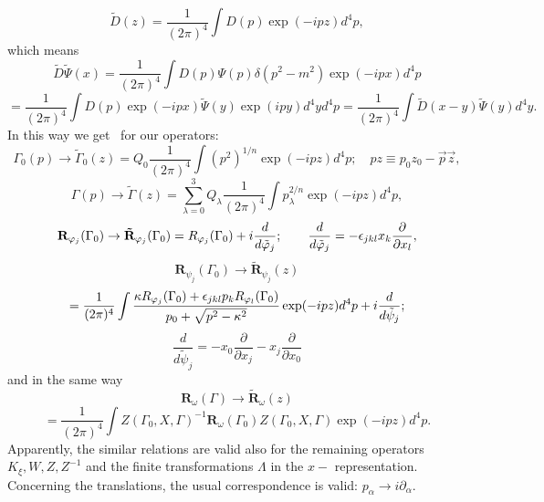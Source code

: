\documentclass[a4paper,a4paper]{article}
\begin{document}
\begin{equation}
\tilde{D}(z)=\frac{1}{(2\pi )^{4}}\int D(p)\exp \left( -ipz\right) d^{4}p,
\label{s111}
\end{equation}%
which means%
\begin{equation}
\tilde{D}\tilde{\Psi}(x)=\frac{1}{(2\pi )^{4}}\int D(p)\Psi (p)\delta
(p^{2}-m^{2})\exp (-ipx)d^{4}p  \label{s112}
\end{equation}%
\begin{equation*}
=\frac{1}{(2\pi )^{4}}\int D(p)\exp (-ipx)\tilde{\Psi}(y)\exp
(ipy)d^{4}yd^{4}p=\frac{1}{(2\pi )^{4}}\int \tilde{D}(x-y)\tilde{\Psi}%
(y)d^{4}y.
\end{equation*}%
In this way we get \ for our operators: 
\begin{equation}
\Gamma _{0}(p)\rightarrow \tilde{\Gamma}_{0}(z)=Q_{0}\frac{1}{(2\pi )^{4}}%
\int (p^{2})^{1/n}\exp (-ipz)d^{4}p;\quad pz\equiv p_{0}z_{0}-\vec{p}\vec{z},
\label{s83}
\end{equation}%
\begin{equation}
\Gamma (p)\rightarrow \tilde{\Gamma}(z)=\sum_{\lambda =0}^{3}Q_{\lambda }%
\frac{1}{(2\pi )^{4}}\int p_{\lambda }^{2/n}\exp (-ipz)d^{4}p,  \label{s84}
\end{equation}%
\begin{equation}
\mathbf{R}_{\varphi _{j}}(\Gamma _{0})\rightarrow \mathbf{\tilde{R}}%
_{\varphi _{j}}(\Gamma _{0})=R_{\varphi _{j}}(\Gamma _{0})+i\frac{d}{d\tilde{%
\varphi}_{j}};\qquad \frac{d}{d\tilde{\varphi}_{j}}=-\epsilon _{jkl}x_{k}%
\frac{\partial }{\partial x_{l}},  \label{s85}
\end{equation}%
\begin{equation}
\mathbf{R}_{\psi _{j}}(\Gamma _{0})\rightarrow \mathbf{\tilde{R}}_{\psi
_{j}}(z)  \label{s86}
\end{equation}%
\begin{equation*}
=\frac{1}{(2\pi )^{4}}\int \frac{\kappa R_{\varphi _{j}}(\Gamma
_{0})+\epsilon _{jkl}p_{k}R_{\varphi _{l}}(\Gamma _{0})}{p_{0}+\sqrt{%
p^{2}-\kappa ^{2}}}\exp (-ipz)d^{4}p+i\frac{d}{d\tilde{\psi}_{j}};
\end{equation*}%
\begin{equation*}
\frac{d}{d\tilde{\psi}_{j}}=-x_{0}\frac{\partial }{\partial x_{j}}-x_{j}%
\frac{\partial }{\partial x_{0}}
\end{equation*}%
and in the same way 
\begin{equation}
\mathbf{R}_{\omega }(\Gamma )\rightarrow \mathbf{\tilde{R}}_{\omega }(z)
\label{s87}
\end{equation}%
\begin{equation*}
=\frac{1}{(2\pi )^{4}}\int Z(\Gamma _{0},X,\Gamma )^{-1}\mathbf{R}_{\omega
}(\Gamma _{0})Z(\Gamma _{0},X,\Gamma )\exp (-ipz)d^{4}p.
\end{equation*}%
Apparently, the similar relations are valid also for the remaining operators 
$K_{\xi },W,Z,Z^{-1}$ and the finite transformations $\Lambda $ in the $x-$%
representation. Concerning the translations, the usual correspondence is
valid: $p_{\alpha }\rightarrow i\partial _{\alpha }$.
\end{document}

